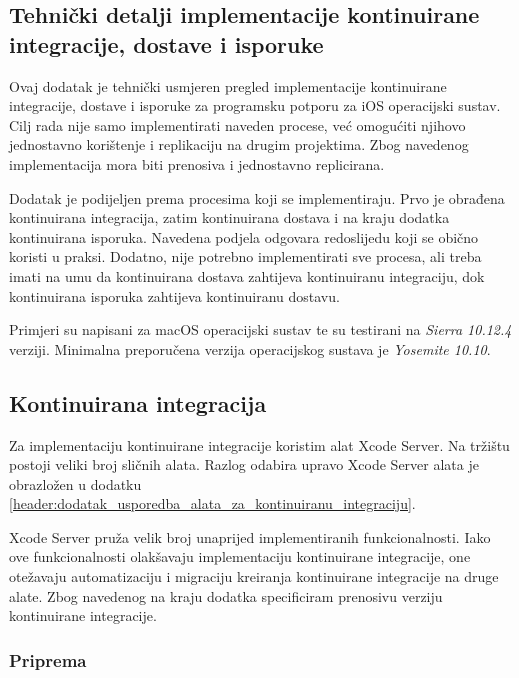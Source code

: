 \documentclass[times, utf8, diplomski, numeric]{fer}
\begin{document}
\begin{appendices}



\chapter{Tehnički detalji implementacije kontinuirane integracije, dostave i isporuke}

Ovaj dodatak je tehnički usmjeren pregled implementacije kontinuirane integracije, dostave i isporuke za programsku potporu za iOS operacijski sustav. Cilj rada nije samo implementirati naveden procese, već omogućiti njihovo jednostavno korištenje i replikaciju na drugim projektima. Zbog navedenog implementacija mora biti prenosiva i jednostavno replicirana.

Dodatak je podijeljen prema procesima koji se implementiraju. Prvo je obrađena kontinuirana integracija, zatim kontinuirana dostava i na kraju dodatka kontinuirana isporuka. Navedena podjela odgovara redoslijedu koji se obično koristi u praksi. Dodatno, nije potrebno implementirati sve procesa, ali treba imati na umu da kontinuirana dostava zahtijeva kontinuiranu integraciju, dok kontinuirana isporuka zahtijeva kontinuiranu dostavu.

Primjeri su napisani za macOS operacijski sustav te su testirani na \textit{Sierra 10.12.4} verziji. Minimalna preporučena verzija operacijskog sustava je \textit{Yosemite 10.10}.

\section{Kontinuirana integracija}

Za implementaciju kontinuirane integracije koristim alat Xcode Server. Na tržištu postoji veliki broj sličnih alata. Razlog odabira upravo Xcode Server alata je obrazložen u dodatku \ref{header:dodatak_usporedba_alata_za_kontinuiranu_integraciju}.

Xcode Server pruža velik broj unaprijed implementiranih funkcionalnosti. Iako ove funkcionalnosti olakšavaju implementaciju kontinuirane integracije, one otežavaju automatizaciju i migraciju kreiranja kontinuirane integracije na druge alate. Zbog navedenog na kraju dodatka specificiram prenosivu verziju kontinuirane integracije.

\subsection{Priprema} \label{header:dodatak_priprema_CI}


\end{appendices}
\end{document}
